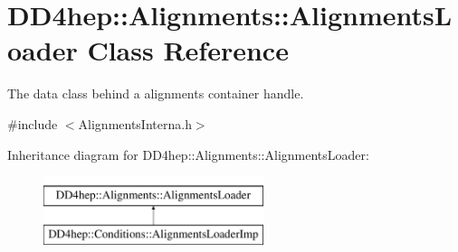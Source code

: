 \hypertarget{class_d_d4hep_1_1_alignments_1_1_alignments_loader}{}\section{D\+D4hep\+:\+:Alignments\+:\+:Alignments\+Loader Class Reference}
\label{class_d_d4hep_1_1_alignments_1_1_alignments_loader}


The data class behind a alignments container handle.  




{\ttfamily \#include $<$Alignments\+Interna.\+h$>$}

Inheritance diagram for D\+D4hep\+:\+:Alignments\+:\+:Alignments\+Loader\+:\begin{figure}[H]
\begin{center}
\leavevmode
\includegraphics[height=2.000000cm]{class_d_d4hep_1_1_alignments_1_1_alignments_loader}
\end{center}
\end{figure}
